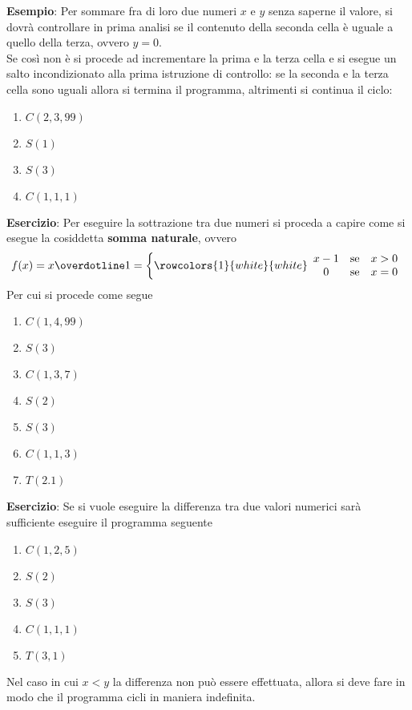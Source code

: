 \documentclass[a4paper]{extarticle}
\begin{document}
\vspace{1em}
\noindent
\textbf{Esempio}: Per sommare fra di loro due numeri \(x\) e \(y\) senza saperne il valore, si dovrà controllare in prima analisi se il contenuto della seconda cella è uguale a quello della terza, ovvero \(y = 0\).\\
Se così non è si procede ad incrementare la prima e la terza cella e si esegue un salto incondizionato alla prima istruzione di controllo: se la seconda e la terza cella sono uguali allora si termina il programma, altrimenti si continua il ciclo:
\begin{enumerate}
    \item \(C(2, 3, 99)\)
    \item \(S(1)\)
    \item \(S(3)\)
    \item \(C(1, 1, 1)\)
\end{enumerate}

\vspace{1em}
\noindent
\textbf{Esercizio}: Per eseguire la sottrazione tra due numeri si proceda a capire come si esegue la cosiddetta \textbf{somma naturale}, ovvero
\[f(x) = x \overdotline 1 = \left\{
    \rowcolors{1}{white}{white}
    \begin{array}{ccc}
         x - 1 & \text{se} & x > 0\\
         0 & \text{se} & x = 0
    \end{array}
\right.\]
Per cui si procede come segue
\begin{enumerate}
    \item \(C(1, 4, 99)\)
    \item \(S(3)\)
    \item \(C(1, 3, 7)\)
    \item \(S(2)\)
    \item \(S(3)\)
    \item \(C(1, 1, 3)\)
    \item \(T(2. 1)\)
\end{enumerate}

\vspace{1em}
\noindent
\textbf{Esercizio}: Se si vuole eseguire la differenza tra due valori numerici sarà sufficiente eseguire il programma seguente
\begin{enumerate}
    \item \(C(1, 2,5)\)
    \item \(S(2)\)
    \item \(S(3)\)
    \item \(C(1, 1, 1)\)
    \item \(T(3, 1)\)
\end{enumerate}
Nel caso in cui \(x < y\) la differenza non può essere effettuata, allora si deve fare in modo che il programma cicli in maniera indefinita.
\end{document}
